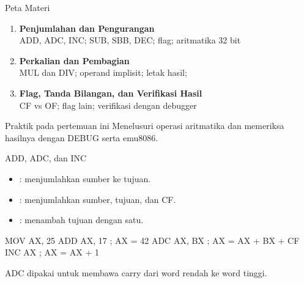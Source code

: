 \documentclass[aspectratio=169,11pt]{beamer}
\begin{document}
\begin{frame}{Peta Materi}
\small
\begin{enumerate}
    \item \textbf{Penjumlahan dan Pengurangan}\\
          {\footnotesize ADD, ADC, INC; SUB, SBB, DEC; flag;
          aritmatika 32 bit}

    \vspace{0.25em}
    \item \textbf{Perkalian dan Pembagian}\\
          {\footnotesize MUL dan DIV; operand implisit; letak hasil;
          }

    \vspace{0.25em}
    \item \textbf{Flag, Tanda Bilangan, dan Verifikasi Hasil}\\
          {\footnotesize CF vs OF; flag lain; verifikasi dengan
          debugger}
\end{enumerate}

\vspace{0.35em}
\begin{block}{Praktik pada pertemuan ini}
\small Menelusuri operasi aritmatika dan memeriksa hasilnya dengan
DEBUG serta emu8086.
\end{block}
\end{frame}


\begin{frame}[fragile]{ADD, ADC, dan INC}
\small
\begin{itemize}
    \item {}: menjumlahkan sumber ke tujuan.
    \item {}: menjumlahkan sumber, tujuan,
          dan CF.
    \item {}: menambah tujuan dengan satu.
\end{itemize}

\vspace{0.2em}
\begin{kodeasm}[numbers=none]
MOV AX, 25
ADD AX, 17          ; AX = 42
ADC AX, BX          ; AX = AX + BX + CF
INC AX              ; AX = AX + 1
\end{kodeasm}

\vspace{0.1em}
{\footnotesize\color{obeGray}ADC dipakai untuk membawa carry dari
word rendah ke word tinggi.\par}
\end{frame}
\end{document}
